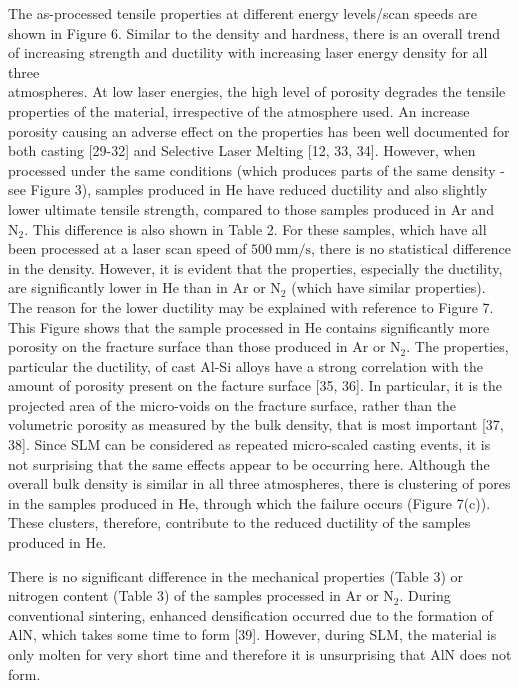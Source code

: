 \documentclass[10pt]{article}
\begin{document}
The as-processed tensile properties at different energy levels/scan speeds are shown in Figure 6. Similar to the density and hardness, there is an overall trend of increasing strength and ductility with increasing laser energy density for all three\\
atmospheres. At low laser energies, the high level of porosity degrades the tensile properties of the material, irrespective of the atmosphere used. An increase porosity causing an adverse effect on the properties has been well documented for both casting [29-32] and Selective Laser Melting [12, 33, 34]. However, when processed under the same conditions (which produces parts of the same density - see Figure 3), samples produced in He have reduced ductility and also slightly lower ultimate tensile strength, compared to those samples produced in $\mathrm{Ar}$ and $\mathrm{N}_{2}$. This difference is also shown in Table 2. For these samples, which have all been processed at a laser scan speed of $500 \mathrm{~mm} / \mathrm{s}$, there is no statistical difference in the density. However, it is evident that the properties, especially the ductility, are significantly lower in He than in $\mathrm{Ar}$ or $\mathrm{N}_{2}$ (which have similar properties). The reason for the lower ductility may be explained with reference to Figure 7. This Figure shows that the sample processed in He contains significantly more porosity on the fracture surface than those produced in $\mathrm{Ar}$ or $\mathrm{N}_{2}$. The properties, particular the ductility, of cast Al-Si alloys have a strong correlation with the amount of porosity present on the facture surface [35, 36]. In particular, it is the projected area of the micro-voids on the fracture surface, rather than the volumetric porosity as measured by the bulk density, that is most important [37, 38]. Since SLM can be considered as repeated micro-scaled casting events, it is not surprising that the same effects appear to be occurring here. Although the overall bulk density is similar in all three atmospheres, there is clustering of pores in the samples produced in He, through which the failure occurs (Figure 7(c)). These clusters, therefore, contribute to the reduced ductility of the samples produced in $\mathrm{He}$.

There is no significant difference in the mechanical properties (Table 3) or nitrogen content (Table 3) of the samples processed in Ar or $\mathrm{N}_{2}$. During conventional sintering, enhanced densification occurred due to the formation of AlN, which takes some time to form [39]. However, during SLM, the material is only molten for very short time and therefore it is unsurprising that AlN does not form.
\end{document}
